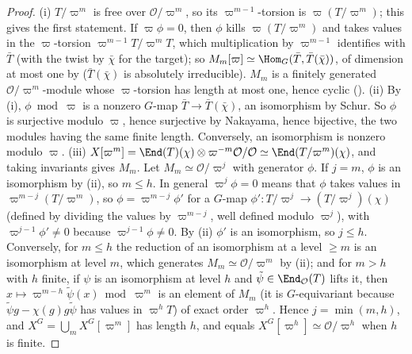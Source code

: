 \begin{proof}
(i) $T/\varpi^m$ is free over $\mathcal{O}/\varpi^m$, so its $\varpi^{m-1}$-torsion is $\varpi(T/\varpi^m)$; this gives the first statement. If $\varpi\phi=0$, then $\phi$ kills
$\varpi(T/\varpi^m)$ and takes values in the $\varpi$-torsion $\varpi^{m-1}T/\varpi^mT$, which multiplication by $\varpi^{m-1}$ identifies with $\bar T$ (with the twist by $\bar\chi$
for the target); so $M_m[\varpi]\simeq\Hom_G(\bar T,\bar T(\bar\chi))$, of dimension at most one by  ($\bar T(\bar\chi)$ is absolutely irreducible).
$M_m$ is a finitely generated $\mathcal{O}/\varpi^m$-module whose $\varpi$-torsion has length at most one, hence cyclic ().
(ii) By (i), $\phi\bmod\varpi$ is a nonzero $G$-map $\bar T\to\bar T(\bar\chi)$, an isomorphism by Schur. So $\phi$ is surjective modulo $\varpi$, hence surjective by
Nakayama, hence bijective, the two modules having the same finite length. Conversely, an isomorphism is nonzero modulo $\varpi$.
(iii) $X[\varpi^m]=\End(T)(\chi)\otimes\varpi^{-m}\mathcal{O}/\mathcal{O}\simeq\End(T/\varpi^m)(\chi)$, and taking invariants gives $M_m$. Let $M_m\simeq\mathcal{O}/\varpi^j$ with generator $\phi$. If
$j=m$, $\phi$ is an isomorphism by (ii), so $m\le h$. In general $\varpi^j\phi=0$ means that $\phi$ takes values in $\varpi^{m-j}(T/\varpi^m)$, so $\phi=\varpi^{m-j}\phi'$ for a
$G$-map $\phi'\colon T/\varpi^j\to(T/\varpi^j)(\chi)$ (defined by dividing the values by $\varpi^{m-j}$, well defined modulo $\varpi^j$), with $\varpi^{j-1}\phi'\ne0$ because
$\varpi^{j-1}\phi\ne0$. By (ii) $\phi'$ is an isomorphism, so $j\le h$. Conversely, for $m\le h$ the reduction of an isomorphism at a level $\ge m$ is an
isomorphism at level $m$, which generates $M_m\simeq\mathcal{O}/\varpi^m$ by (ii); and for $m>h$ with $h$ finite, if $\psi$ is an isomorphism at level $h$ and $\tilde\psi\in\End_\mathcal{O}(T)$
lifts it, then $x\mapsto\varpi^{m-h}\tilde\psi(x)\bmod\varpi^m$ is an element of $M_m$ (it is $G$-equivariant because $\tilde\psi g-\chi(g)g\tilde\psi$ has values in
$\varpi^hT$) of exact order $\varpi^h$. Hence $j=\min(m,h)$, and $X^G=\bigcup_mX^G[\varpi^m]$ has length $h$, and equals $X^G[\varpi^h]\simeq\mathcal{O}/\varpi^h$ when $h$ is finite.


\end{proof}
